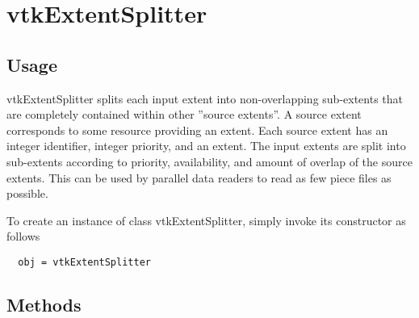 \section{vtkExtentSplitter}

\subsection{Usage}

 vtkExtentSplitter splits each input extent into non-overlapping
 sub-extents that are completely contained within other ''source
 extents''.  A source extent corresponds to some resource providing
 an extent.  Each source extent has an integer identifier, integer
 priority, and an extent.  The input extents are split into
 sub-extents according to priority, availability, and amount of
 overlap of the source extents.  This can be used by parallel data
 readers to read as few piece files as possible.

To create an instance of class vtkExtentSplitter, simply
invoke its constructor as follows
\begin{verbatim}
  obj = vtkExtentSplitter
\end{verbatim}
\subsection{Methods}

